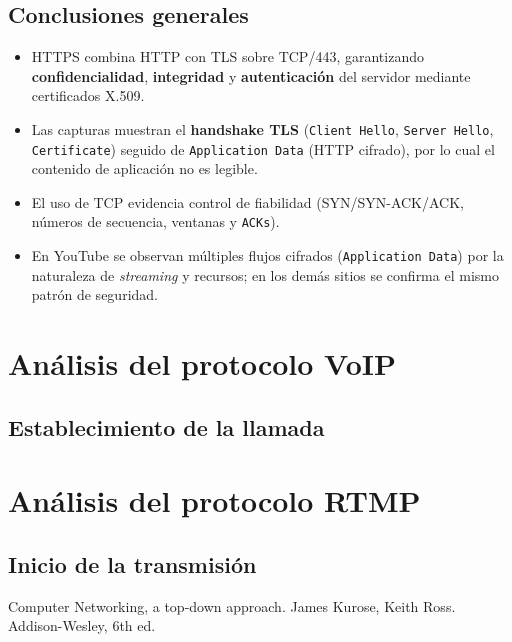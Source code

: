 \documentclass[10pt]{article}
\begin{document}
\subsection*{Conclusiones generales}
\begin{itemize}
    \item HTTPS combina HTTP con TLS sobre TCP/443, garantizando \textbf{confidencialidad}, \textbf{integridad} y \textbf{autenticación} del servidor mediante certificados X.509.
    \item Las capturas muestran el \textbf{handshake TLS} (\texttt{Client Hello}, \texttt{Server Hello}, \texttt{Certificate}) seguido de \texttt{Application Data} (HTTP cifrado), por lo cual el contenido de aplicación no es legible.
    \item El uso de TCP evidencia control de fiabilidad (SYN/SYN-ACK/ACK, números de secuencia, ventanas y \texttt{ACKs}).
    \item En YouTube se observan múltiples flujos cifrados (\texttt{Application Data}) por la naturaleza de \textit{streaming} y recursos; en los demás sitios se confirma el mismo patrón de seguridad.
\end{itemize}



\renewcommand{\thesection}{8.\arabic{section}}
\section{Análisis del protocolo VoIP}
\subsection{Establecimiento de la llamada}


\renewcommand{\thesection}{8.\arabic{section}}
\section{Análisis del protocolo RTMP}
\subsection{Inicio de la transmisión}










\begin{thebibliography}{9}


  Computer Networking, a top-down approach. James Kurose, Keith Ross. Addison-Wesley, 6th ed.

  \end{thebibliography}
\end{document}
